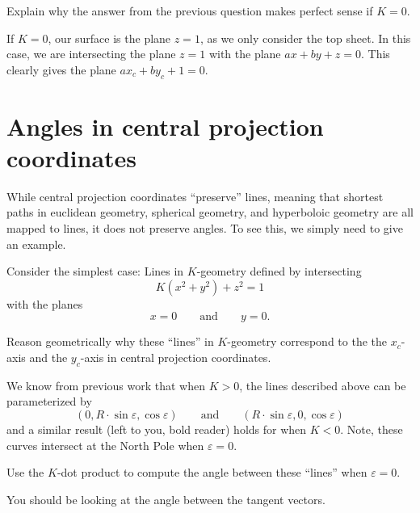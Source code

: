 \documentclass{ximera}
\begin{document}
\begin{problem}
  Explain why the answer from the previous question makes perfect sense if $K=0$.
  \begin{freeResponse}
    If $K=0$, our surface is the plane $z=1$, as we only consider the
    top sheet. In this case, we are intersecting the plane $z=1$ with
    the plane $ax+by+z=0$. This clearly gives the plane $ax_c+ by_c +
    1 = 0.$
  \end{freeResponse}
\end{problem}



\section{Angles in central projection coordinates}

While central projection coordinates ``preserve'' lines, meaning that
shortest paths in euclidean geometry, spherical geometry, and
hyperboloic geometry are all mapped to lines, it does not preserve
angles. To see this, we simply need to give an example.


Consider the simplest case: Lines in $K$-geometry defined by
intersecting
\[
K\left(x^2+y^2\right) + z^2 = 1
\]
with the planes
\[
x=0 \qquad\text{and}\qquad y=0.
\]

\begin{problem}
  Reason geometrically why these ``lines'' in $K$-geometry correspond
  to the the $x_c$-axis and the $y_c$-axis in central projection
  coordinates.
\end{problem}

We know from previous work that when $K>0$, the lines described above
can be parameterized by
\[
(0, R\cdot \sin\varepsilon,\cos\varepsilon)\qquad\text{and}\qquad(R\cdot \sin\varepsilon, 0, \cos\varepsilon)
\]
and a similar result (left to you, bold reader) holds for when
$K<0$. Note, these curves intersect at the North Pole when
$\varepsilon =0$.

\begin{problem}
  Use the $K$-dot product to compute the angle between these ``lines'' when $\varepsilon=0$.
  \begin{hint}
    You should be looking at the angle between the tangent vectors.
  \end{hint}
\end{problem}
\end{document}
